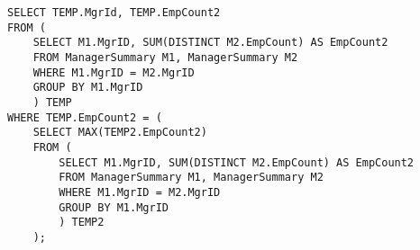 \begin{enumerate}
\begin{enumerate}[label=(\alph*)]
\begin{verbatim}
SELECT TEMP.MgrId, TEMP.EmpCount2
FROM (
	SELECT M1.MgrID, SUM(DISTINCT M2.EmpCount) AS EmpCount2
	FROM ManagerSummary M1, ManagerSummary M2
	WHERE M1.MgrID = M2.MgrID
	GROUP BY M1.MgrID
	) TEMP
WHERE TEMP.EmpCount2 = (
	SELECT MAX(TEMP2.EmpCount2)
	FROM (
		SELECT M1.MgrID, SUM(DISTINCT M2.EmpCount) AS EmpCount2
		FROM ManagerSummary M1, ManagerSummary M2
		WHERE M1.MgrID = M2.MgrID
		GROUP BY M1.MgrID
		) TEMP2
	);
\end{verbatim}

\end{enumerate}

\end{enumerate}

